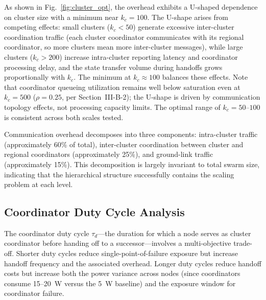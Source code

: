 \documentclass[journal]{IEEEtran}
\begin{document}
As shown in Fig.~\ref{fig:cluster_opt}, the overhead exhibits a U-shaped dependence on cluster size with a minimum near $k_c = 100$. The U-shape arises from competing effects: small clusters ($k_c < 50$) generate excessive inter-cluster coordination traffic (each cluster coordinator communicates with its regional coordinator, so more clusters mean more inter-cluster messages), while large clusters ($k_c > 200$) increase intra-cluster reporting latency and coordinator processing delay, and the state transfer volume during handoffs grows proportionally with $k_c$. The minimum at $k_c \approx 100$ balances these effects. Note that coordinator queueing utilization remains well below saturation even at $k_c = 500$ ($\rho = 0.25$, per Section~III-B-2); the U-shape is driven by communication topology effects, not processing capacity limits. The optimal range of $k_c = 50$--$100$ is consistent across both scales tested.

Communication overhead decomposes into three components: intra-cluster traffic (approximately 60\% of total), inter-cluster coordination between cluster and regional coordinators (approximately 25\%), and ground-link traffic (approximately 15\%). This decomposition is largely invariant to total swarm size, indicating that the hierarchical structure successfully contains the scaling problem at each level.

\subsection{Coordinator Duty Cycle Analysis}

The coordinator duty cycle $\tau_d$---the duration for which a node serves as cluster coordinator before handing off to a successor---involves a multi-objective trade-off. Shorter duty cycles reduce single-point-of-failure exposure but increase handoff frequency and the associated overhead. Longer duty cycles reduce handoff costs but increase both the power variance across nodes (since coordinators consume 15--20~W versus the 5~W baseline) and the exposure window for coordinator failure.
\end{document}
